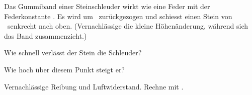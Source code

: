 Das Gummiband einer Steinschleuder wirkt wie eine Feder mit der Federkonstante \kO. Es wird um \sGO\ zurückgezogen und schiesst einen Stein von \mO\ senkrecht nach oben. (Vernachlässige die kleine Höhenänderung, während sich das Band zusammenzieht.)

\begin{abcliste}
\abc
Wie schnell verlässt der Stein die Schleuder?

\abc
Wie hoch über diesem Punkt steigt er?
\end{abcliste}

Vernachlässige Reibung und Luftwiderstand. Rechne mit \gO.
